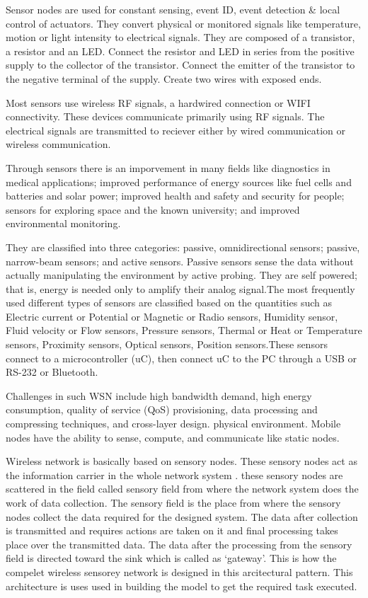 Sensor nodes are used for constant sensing, event ID, event detection \& local control of actuators. They convert physical or monitored signals like temperature, motion or light intensity to electrical signals. They are composed of a transistor, a resistor and an LED. Connect the resistor and LED in series from the positive supply to the collector of the transistor. Connect the emitter of the transistor to the negative terminal of the supply. Create two wires with exposed ends.


Most sensors use wireless RF signals, a hardwired connection or WIFI connectivity. These devices communicate primarily using RF signals. The electrical signals are transmitted to reciever either by wired communication or wireless communication.


Through sensors there is an imporvement in many fields like diagnostics in medical applications; improved performance of energy sources like fuel cells and batteries and solar power; improved health and safety and security for people; sensors for exploring space and the known university; and improved environmental monitoring.


They are classified into three categories: passive, omnidirectional sensors; passive, narrow-beam sensors; and active sensors. Passive sensors sense the data without actually manipulating the environment by active probing. They are self powered; that is, energy is needed only to amplify their analog signal.The most frequently used different types of sensors are classified based on the quantities such as Electric current or Potential or Magnetic or Radio sensors, Humidity sensor, Fluid velocity or Flow sensors, Pressure sensors, Thermal or Heat or Temperature sensors, Proximity sensors, Optical sensors, Position sensors.These sensors connect  to a microcontroller (uC), then connect uC to the PC through a USB or RS-232 or Bluetooth.


Challenges in such WSN include high bandwidth demand, high energy consumption, quality of service (QoS) provisioning, data processing and compressing techniques, and cross-layer design. physical environment\cite{12}. Mobile nodes have the ability to sense, compute, and communicate like static nodes.


Wireless network is basically based on sensory nodes. These sensory nodes act as the information carrier in the whole network system . these sensory nodes are scattered in the field called sensory field from where the network system does the work of data collection. The sensory field is the place from where the sensory nodes collect the data required for the designed system. The data after collection is transmitted and requires actions are taken on it and final processing takes place over the transmitted data. The data after the processing from the sensory field is directed toward the sink which is called as ‘gateway’. This is how the compelet wireless sensorey network is designed in this arcitectural pattern. This architecture is uses used in building the model to get the required task executed.


